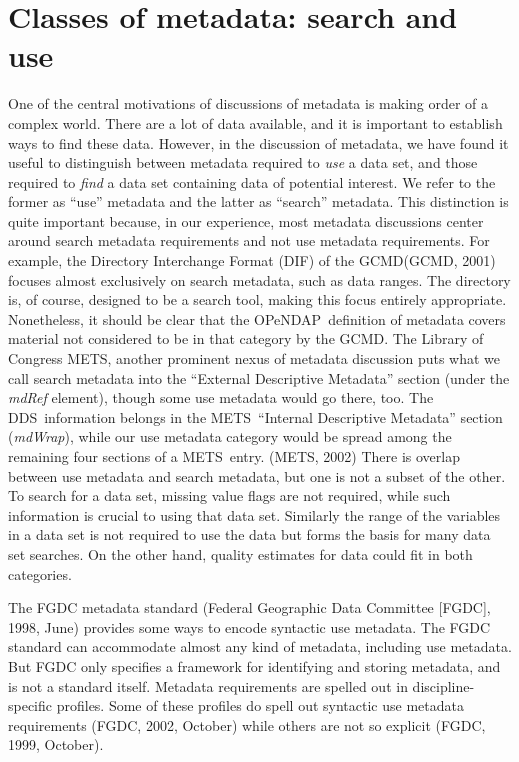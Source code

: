 \documentclass{codata}
\newcommand{\gcmd}{\ac{GCMD}}
\newcommand{\opendap}{\ac{OPeNDAP}}
\newcommand{\mets}{\ac{METS}}
\newcommand{\dds}{\ac{DDS}}
\begin{document}
\section{Classes of metadata: search and use}
\label{sec:searchanduse}

One of the central motivations of discussions of metadata is making
order of a complex world.  There are a lot of data available, and it
is important to establish ways to find these data.  However, in the
discussion of metadata, we have found it useful to distinguish between
metadata required to \emph{use} a data set, and those required to
\emph{find} a data set containing data of potential interest.  We
refer to the former as ``use'' metadata and the latter as ``search''
metadata.  This distinction is quite important because, in our
experience, most metadata discussions center around search metadata
requirements and not use metadata requirements.  For example, the
Directory Interchange Format (DIF) of the \gcmd (GCMD, 2001)
focuses almost exclusively on search metadata, such as data ranges.
The directory is, of course, designed to be a search tool, making this
focus entirely appropriate.  Nonetheless, it should be clear that the
\opendap\ definition of metadata covers material not considered to be
in that category by the \gcmd.  The Library of Congress \mets, another
prominent nexus of metadata discussion puts what we call search
metadata into the ``External Descriptive Metadata'' section (under the
\emph{mdRef} element), though some use metadata would go there, too.
The \dds\ information belongs in the \mets\ ``Internal Descriptive
Metadata'' section (\emph{mdWrap}), while our use metadata category
would be spread among the remaining four sections of a \mets\ entry.
(METS, 2002) There is overlap between use metadata and search
metadata, but one is not a subset of the other.  To search for a data
set, missing value flags are not required, while such information is
crucial to using that data set.  Similarly the range of the variables
in a data set is not required to use the data but forms the basis for
many data set searches.  On the other hand, quality estimates for data
could fit in both categories.

The \ac{FGDC} metadata standard (Federal Geographic Data Committee
[FGDC], 1998, June) provides some
ways to encode syntactic use metadata.  The \ac{FGDC} standard can
accommodate almost any kind of metadata, including use metadata.  But
\ac{FGDC} only specifies a framework for identifying and storing
metadata, and is not a standard itself.  Metadata requirements are spelled
out in discipline-specific profiles.  Some of these profiles do spell
out syntactic use metadata requirements (FGDC, 2002, October)
while others are not so explicit (FGDC, 1999, October).
\end{document}
